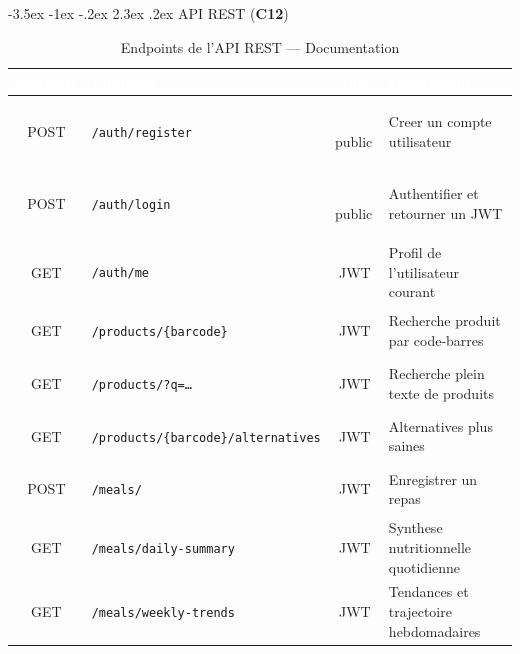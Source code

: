 \documentclass[a4paper,11pt,oneside,openany]{report}
\makeatletter
\renewcommand\section{\@startsection{section}{1}{\z@}%
  {-3.5ex \@plus -1ex \@minus -.2ex}%
  {2.3ex \@plus.2ex}%
  {\normalfont\Large\bfseries\color{ntgreen}}}
\newcommand{\competence}[1]{\textbf{\textcolor{ntgreen}{#1}}}
\makeatother
\begin{document}
\section{API REST (\competence{C12})}
\label{sec:c12}

\newcommand{\mGET}{\colorbox{ntgreen}{\color{white}\footnotesize\bfseries\strut\ GET\ }}
\newcommand{\mPOST}{\colorbox{ntorange}{\color{white}\footnotesize\bfseries\strut\ POST\ }}
\newcommand{\authpublic}{\colorbox{ntgray!50}{\color{white}\scriptsize\bfseries\strut\,public\,}}
\newcommand{\authbearer}{\colorbox{ntblue}{\color{white}\scriptsize\bfseries\strut\,JWT\,}}

\begin{table}[H]
\centering
\caption{Endpoints de l'API REST --- Documentation}
\label{tab:api}
\small
{}
\begin{tabularx}{\textwidth}{@{}c l c X@{}}
\toprule
\rowcolor{ntgreen}
\textcolor{white}{\textbf{Methode}} & \textcolor{white}{\textbf{Endpoint}} & \textcolor{white}{\textbf{Auth}} & \textcolor{white}{\textbf{Description}} \\
\midrule
\mPOST & \texttt{/auth/register} & \authpublic & Creer un compte utilisateur \\
\mPOST & \texttt{/auth/login} & \authpublic & Authentifier et retourner un JWT \\
\mGET & \texttt{/auth/me} & \authbearer & Profil de l'utilisateur courant \\
\mGET & \texttt{/products/\{barcode\}} & \authbearer & Recherche produit par code-barres \\
\mGET & \texttt{/products/?q=\ldots} & \authbearer & Recherche plein texte de produits \\
\mGET & \texttt{/products/\{barcode\}/alternatives} & \authbearer & Alternatives plus saines \\
\mPOST & \texttt{/meals/} & \authbearer & Enregistrer un repas \\
\mGET & \texttt{/meals/daily-summary} & \authbearer & Synthese nutritionnelle quotidienne \\
\mGET & \texttt{/meals/weekly-trends} & \authbearer & Tendances et trajectoire hebdomadaires \\
\bottomrule
\end{tabularx}
\end{table}
\end{document}
